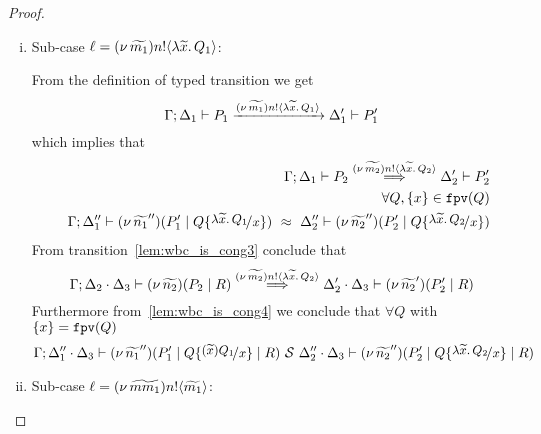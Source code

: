 \begin{proof}
\begin{enumerate}
\begin{enumerate}[i.]
					\item	Sub-case $\ell = (\nu\, \widetilde{m_1}) n ! \langle \lambda \widetilde{x}.\,Q_1 \rangle$:

							\noi From the definition of typed transition we get
							\[
								\Gamma; \Delta_1 \vdash P_1 \xrightarrow{(\nu\, \widetilde{m_1}) n ! \langle \lambda \widetilde{x}.\,Q_1 \rangle} \Delta_1' \vdash P_1'
							\]
							\noi which implies that
							\begin{eqnarray}
								&& \horel{\Gamma}{\Delta_1}{P_2}{\By{\news{\widetilde{m_2}} \bactout{n}{\abs{\widetilde{x}}{Q_2}}}}{\Delta_2'}{P_2'}
								\label{lem:wbc_is_cong3} \\
								&&\forall Q, \set{x} \in \fpv{Q} \nonumber \\
								&& \horel{\Gamma}{\Delta_1''}{\newsp{\widetilde{n_1}''}{P_1' \Par Q \subst{\abs{\widetilde{x}}{Q_1}}{x}}}
								{\ \wbc\ }
								{\Delta_2''}{\newsp{\widetilde{n_2}''}{P_2' \Par Q \subst{\abs{\widetilde{x}}{Q_2}}{x}}}
								\label{lem:wbc_is_cong4}
							\end{eqnarray}
							\noi From transition~\eqref{lem:wbc_is_cong3} conclude that 
							\[
								\Gamma; \Delta_2 \cdot \Delta_3 \vdash (\nu\, \widetilde{n_2})(P_2 \;|\; R) \stackrel{(\nu\, \widetilde{m_2}) n ! \langle \lambda \widetilde{x}.\,Q_2 \rangle}{\Longrightarrow} \Delta_2' \cdot \Delta_3 \vdash (\nu\, \widetilde{n_2}')(P_2' \;|\; R)
							\]
							\noi Furthermore from~\eqref{lem:wbc_is_cong4} we conclude that $\forall Q$ with $\{x\} = \mathtt{fpv}(Q)$
							\[
								\horel{\Gamma}{\Delta_1'' \cat \Delta_3}{\newsp{\widetilde{n_1}''}{P_1' \Par Q \subst{(\widetilde{x}) Q_1}{x} \Par R}}
								{\ \mathcal{S}\ }
								{\Delta_2'' \cat \Delta_3}{\newsp{\widetilde{n_2}''}{P_2' \Par Q \subst{\abs{\widetilde{x}}{Q_2}}{x} \Par R}}
							\]

					\item	Sub-case $\ell = (\nu\, \widetilde{mm_1}) n ! \langle \widetilde{m_1} \rangle$:


\end{enumerate}
\end{enumerate}
\end{proof}
